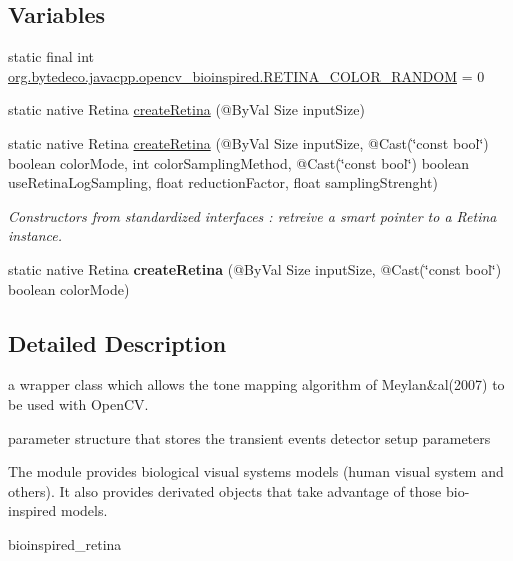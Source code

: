 \subsection*{Variables}
\begin{DoxyCompactItemize}
\item 
static final int \hyperlink{group__bioinspired_ga05a86ff7b93be7a4fe366bddc1b71e83}{org.\+bytedeco.\+javacpp.\+opencv\+\_\+bioinspired.\+R\+E\+T\+I\+N\+A\+\_\+\+C\+O\+L\+O\+R\+\_\+\+R\+A\+N\+D\+OM} = 0
\end{DoxyCompactItemize}
\begin{DoxyCompactItemize}
\item 
static native Retina \hyperlink{group__bioinspired_gad50e4058a5005de5c1c5bdb255b02702}{create\+Retina} (@By\+Val Size input\+Size)
\item 
static native Retina \hyperlink{group__bioinspired_ga050dd55b35ef6df434cb1ce7a98b7954}{create\+Retina} (@By\+Val Size input\+Size, @Cast(\char`\"{}const bool\char`\"{}) boolean color\+Mode, int color\+Sampling\+Method, @Cast(\char`\"{}const bool\char`\"{}) boolean use\+Retina\+Log\+Sampling, float reduction\+Factor, float sampling\+Strenght)
\begin{DoxyCompactList}\small\item\em Constructors from standardized interfaces \+: retreive a smart pointer to a Retina instance. \end{DoxyCompactList}\item 
\mbox{\label{group__bioinspired_gaf6d78b82e5d142922bb192ee8fb618d5}} 
static native Retina {\bfseries create\+Retina} (@By\+Val Size input\+Size, @Cast(\char`\"{}const bool\char`\"{}) boolean color\+Mode)
\end{DoxyCompactItemize}


\subsection{Detailed Description}
a wrapper class which allows the tone mapping algorithm of Meylan\&al(2007) to be used with Open\+CV. 

parameter structure that stores the transient events detector setup parameters

The module provides biological visual systems models (human visual system and others). It also provides derivated objects that take advantage of those bio-\/inspired models. 

bioinspired\+\_\+retina 

